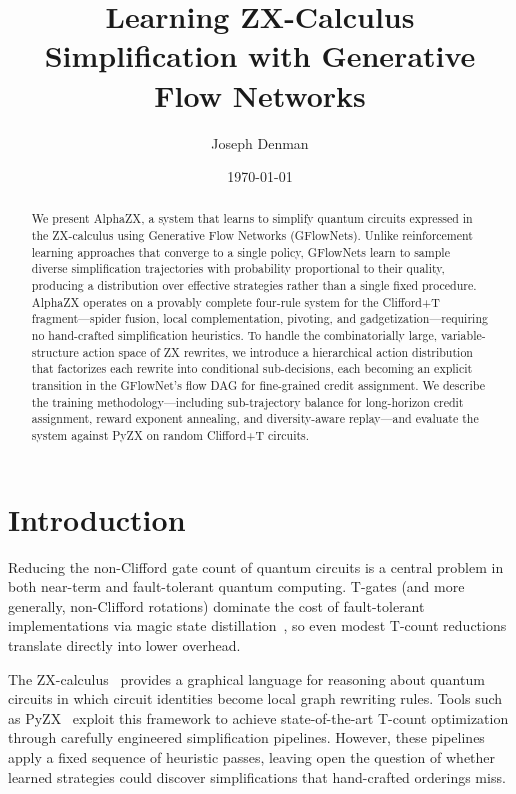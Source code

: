 \documentclass[11pt,a4paper]{article}
\title{Learning ZX-Calculus Simplification with Generative Flow Networks}
\author{
Joseph Denman \\
}
\date{\today}
\begin{document}
\maketitle

\begin{abstract}
We present AlphaZX, a system that learns to simplify quantum circuits
expressed in the ZX-calculus using Generative Flow Networks (GFlowNets).
Unlike reinforcement learning approaches that converge to a single
policy, GFlowNets learn to sample diverse simplification trajectories
with probability proportional to their quality, producing a distribution
over effective strategies rather than a single fixed procedure.  AlphaZX
operates on a provably complete four-rule system for the Clifford+T
fragment---spider fusion, local complementation, pivoting, and
gadgetization---requiring no hand-crafted simplification heuristics.  To
handle the combinatorially large, variable-structure action space of ZX
rewrites, we introduce a hierarchical action distribution that factorizes
each rewrite into conditional sub-decisions, each becoming an explicit
transition in the GFlowNet's flow DAG for fine-grained credit assignment.
We describe the training methodology---including sub-trajectory balance
for long-horizon credit assignment, reward exponent annealing, and
diversity-aware replay---and evaluate the system against PyZX on random
Clifford+T circuits.
\end{abstract}


\section{Introduction}\label{sec:intro}

Reducing the non-Clifford gate count of quantum circuits is a central
problem in both near-term and fault-tolerant quantum computing.  T-gates
(and more generally, non-Clifford rotations) dominate the cost of
fault-tolerant implementations via magic state
distillation~\cite{bravyi2005universal}, so even modest T-count
reductions translate directly into lower overhead.

The ZX-calculus~\cite{coecke2011interacting} provides a graphical
language for reasoning about quantum circuits in which circuit identities
become local graph rewriting rules.  Tools such as
PyZX~\cite{kissinger2020pyzx} exploit this framework to achieve
state-of-the-art T-count optimization through carefully engineered
simplification pipelines.  However, these pipelines apply a fixed
sequence of heuristic passes, leaving open the question of whether
learned strategies could discover simplifications that hand-crafted
orderings miss.
\end{document}
